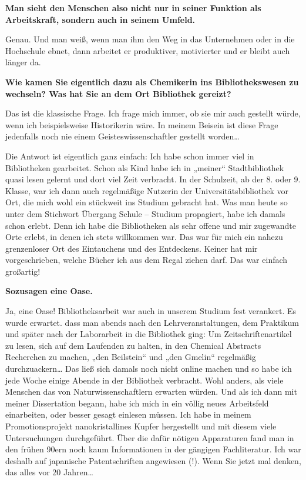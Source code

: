 \documentclass[a4paper,
fontsize=11pt,
oneside,
numbers=noperiodatend,
parskip=half-,
bibliography=totoc,
final
]{scrartcl}
\begin{document}
\textbf{Man sieht den Menschen also nicht nur in seiner Funktion als
Arbeitskraft, sondern auch in seinem Umfeld.~}

Genau. Und man weiß, wenn man ihm den Weg in das Unternehmen oder in die
Hochschule ebnet, dann arbeitet er produktiver, motivierter und er
bleibt auch länger da.~

\textbf{Wie kamen Sie eigentlich dazu als Chemikerin ins
Bibliothekswesen zu wechseln? Was hat Sie an dem Ort Bibliothek
gereizt?~}

Das ist die klassische Frage. Ich frage mich immer, ob sie mir auch
gestellt würde, wenn ich beispielsweise Historikerin wäre. In meinem
Beisein ist diese Frage jedenfalls noch nie einem Geisteswissenschaftler
gestellt worden\ldots{}~

Die Antwort ist eigentlich ganz einfach: Ich habe schon immer viel in
Bibliotheken gearbeitet. Schon als Kind habe ich in „meiner``
Stadtbibliothek quasi lesen gelernt und dort viel Zeit verbracht. In der
Schulzeit, ab der 8. oder 9. Klasse, war ich dann auch regelmäßige
Nutzerin der Universitätsbibliothek vor Ort, die mich wohl ein stückweit
ins Studium gebracht hat. Was man heute so unter dem Stichwort Übergang
Schule -- Studium propagiert, habe ich damals schon erlebt. Denn ich
habe die Bibliotheken als sehr offene und mir zugewandte Orte erlebt, in
denen ich stets willkommen war. Das war für mich ein nahezu grenzenloser
Ort des Eintauchens und des Entdeckens. Keiner hat mir vorgeschrieben,
welche Bücher ich aus dem Regal ziehen darf. Das war einfach großartig!~

\textbf{Sozusagen eine Oase.~}

Ja, eine Oase! Bibliotheksarbeit war auch in unserem Studium fest
verankert. Es wurde erwartet. dass man abends nach den
Lehrveranstaltungen, dem Praktikum und später nach der Laborarbeit in
die Bibliothek ging: Um Zeitschriftenartikel zu lesen, sich auf dem
Laufenden zu halten, in den Chemical Abstracts Recherchen zu machen,
„den Beilstein`` und „den Gmelin`` regelmäßig durchzuackern\ldots{} Das
ließ sich damals noch nicht online machen und so habe ich jede Woche
einige Abende in der Bibliothek verbracht. Wohl anders, als viele
Menschen das von Naturwissenschaftlern erwarten würden. Und als ich dann
mit meiner Dissertation begann, habe ich mich in ein völlig neues
Arbeitsfeld einarbeiten, oder besser gesagt einlesen müssen. Ich habe in
meinem Promotionsprojekt nanokristallines Kupfer hergestellt und mit
diesem viele Untersuchungen durchgeführt. Über die dafür nötigen
Apparaturen fand man in den frühen 90ern noch kaum Informationen in der
gängigen Fachliteratur. Ich war deshalb auf japanische Patentschriften
angewiesen (!). Wenn Sie jetzt mal denken, das alles vor 20
Jahren\ldots{}~
\end{document}
